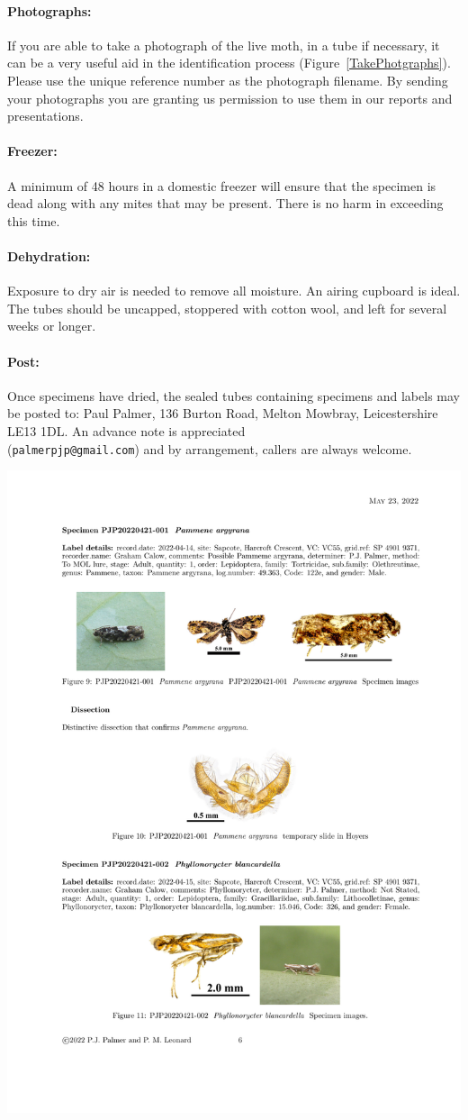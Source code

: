 \documentclass[12pt]{article}
\begin{document}
	\paragraph{Photographs:} If you are able to take a photograph of the live moth, in a tube if necessary, it can be a very useful aid in the identification process (Figure~\ref{TakePhotgraphs}).  Please use the unique reference number as the photograph filename. By sending your photographs you are granting us permission to use them in our reports and presentations.
	

	
	\paragraph{Freezer:} A minimum of 48 hours in a domestic freezer will ensure that the specimen is dead along with any mites that may be present. There is no harm in exceeding this time.
	\paragraph{Dehydration:} Exposure to dry air is needed to remove all moisture. An airing cupboard is ideal. The tubes should be uncapped, stoppered with cotton wool, and left for several weeks or longer. 
	\paragraph{Post:} Once specimens have dried, the sealed tubes containing specimens and labels may be posted to: Paul Palmer, 136 Burton Road, Melton Mowbray, Leicestershire LE13 1DL. An advance note is appreciated \\ (\texttt{palmerpjp@gmail.com}) and by arrangement, callers are always welcome.

	\begin{center}
	\centering
	\includegraphics[width=0.6\linewidth]{images/samplepage}\hfill
	
	\label{Report}
\end{center}
\end{document}
